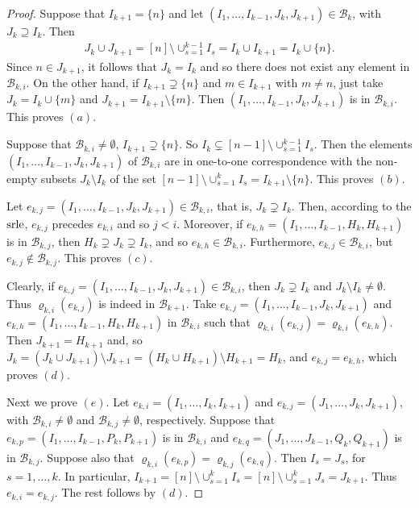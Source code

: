 \documentclass[ALCO]{cedram}
\newcommand{\mcb}{\mbox{$\mathcal{B}$}}
\newcommand{\srle}{\mbox{${\rm srle}$}}
\begin{document}
\begin{proof} 
Suppose that $I_{k+1}=\{n\}$ and let $(I_1,\ldots
,I_{k-1},J_k,J_{k+1})\in\mcb_k$, with $J_k\supseteq I_k$. Then
\begin{eqnarray*}
J_k\cup J_{k+1}=[n]\setminus \cup_{s=1}^{k-1}I_s=I_k\cup I_{k+1}=I_k\cup
\{n\}. 
\end{eqnarray*}
Since $n\in J_{k+1}$, it follows that $J_k=I_k$ and so there
does not exist any element in $\mcb_{k,i}$. On the other hand, if
$I_{k+1}\supsetneq \{n\}$ and $m\in I_{k+1}$ with $m\neq n$, just take
$J_{k}=I_{k}\cup \{m\}$ and $J_{k+1}=I_{k+1}\setminus \{m\}$. Then
$(I_1,\ldots ,I_{k-1},J_k,J_{k+1})$ is in $\mcb_{k,i}$. This proves
$(a)$.

Suppose that $\mcb_{k,i}\neq \emptyset$, \ie $I_{k+1}\supsetneq
\{n\}$. So $I_k\subsetneq [n-1]\setminus \cup_{s=1}^{k-1}I_s$. Then
the elements $(I_1,\ldots ,I_{k-1},J_k,J_{k+1})$ of $\mcb_{k,i}$ are
in one-to-one correspondence with the non-empty subsets $J_k\setminus
I_k$ of the set $[n-1]\setminus \cup_{s=1}^kI_s=I_{k+1}\setminus
\{n\}$. This proves $(b)$.

Let $e_{k,j}=(I_1,\ldots ,I_{k-1},J_k,J_{k+1})\in\mcb_{k,i}$, that is,
$J_k\supsetneq I_k$. Then, according to the $\srle$, $e_{k,j}$
precedes $e_{k,i}$ and so $j<i$. Moreover, if $e_{k,h}=(I_1,\ldots
,I_{k-1},H_k,H_{k+1})$ is in $\mcb_{k,j}$, then $H_k\supsetneq
J_k\supsetneq I_k$, and so $e_{k,h}\in\mcb_{k,i}$. Furthermore,
$e_{k,j}\in\mcb_{k,i}$, but $e_{k,j}\not\in\mcb_{k,j}$. This proves
$(c)$.

Clearly, if $e_{k,j}=(I_1,\ldots ,I_{k-1},J_k,J_{k+1})\in\mcb_{k,i}$,
then $J_k\supsetneq I_k$ and $J_k\setminus I_k\neq \emptyset$. Thus
$\varrho_{k,i}(e_{k,j})$ is indeed in $\mcb_{k+1}$. Take
$e_{k,j}=(I_1,\ldots ,I_{k-1},J_k,J_{k+1})$ and $e_{k,h}=(I_1,\ldots
,I_{k-1},H_k,H_{k+1})$ in $\mcb_{k,i}$ such that
$\varrho_{k,i}(e_{k,j})=\varrho_{k,i}(e_{k,h})$. Then $J_{k+1}=H_{k+1}$
and, so $J_k=(J_{k}\cup J_{k+1})\setminus J_{k+1}= (H_k\cup
H_{k+1})\setminus H_{k+1}=H_k$, and $e_{k,j}=e_{k,h}$, which proves
$(d)$.

Next we prove $(e)$. Let $e_{k,i}=(I_1,\ldots ,I_k,I_{k+1})$ and
$e_{k,j}=(J_1,\ldots ,J_k,J_{k+1})$, with $\mcb_{k,i}\neq \emptyset$
and $\mcb_{k,j}\neq \emptyset$, respectively.  Suppose that
$e_{k,p}=(I_1,\ldots ,I_{k-1},P_k,P_{k+1})$ is in $\mcb_{k,i}$ and
$e_{k,q}=(J_1,\ldots ,J_{k-1},Q_k,Q_{k+1})$ is in
$\mcb_{k,j}$. Suppose also that
$\varrho_{k,i}(e_{k,p})=\varrho_{k,j}(e_{k,q})$. Then $I_s=J_s$, for
$s=1,\ldots ,k$. In particular, $I_{k+1}=[n]\setminus
\cup_{s=1}^kI_s=[n]\setminus\cup_{s=1}^kJ_s=J_{k+1}$. Thus
$e_{k,i}=e_{k,j}$. The rest follows by $(d)$.


\end{proof}
\end{document}
